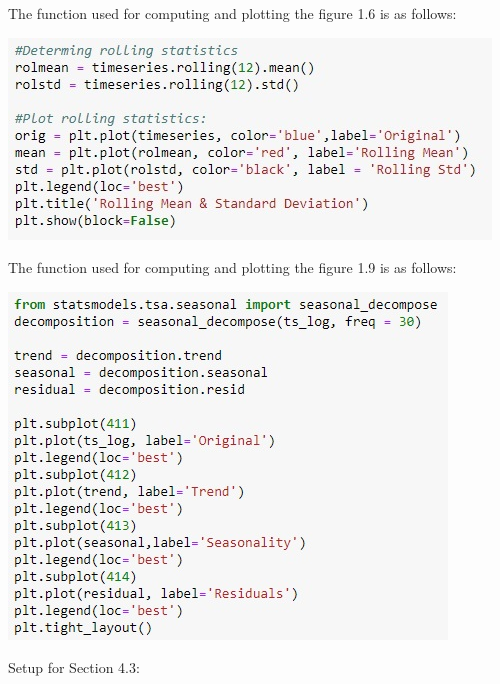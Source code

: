 

The function used for computing and plotting the figure 1.6 is as follows:\\
				\begin{center}
				\includegraphics[width=\linewidth]{figures/fig-1-6-func.jpg}	
				\label{fig: Notations}
				\end{center}

The function used for computing and plotting the figure 1.9 is as follows:\\

				\begin{center}
				\includegraphics[width=\linewidth]{figures/fig-1-9-func.jpg}	
				\label{fig: Notations}
				\end{center}

Setup for Section 4.3:\\

